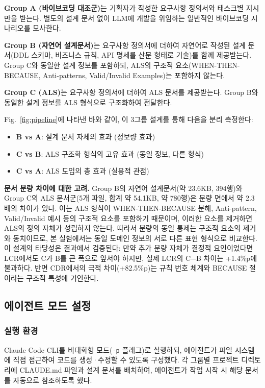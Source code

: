 \documentclass[conference]{IEEEtran}
\begin{document}
\textbf{Group A (바이브코딩 대조군)}는 기획자가 작성한 요구사항 정의서와 태스크별 지시만을 받는다. 별도의 설계 문서 없이 LLM에 개발을 위임하는 일반적인 바이브코딩 시나리오를 모사한다.

\textbf{Group B (자연어 설계문서)}는 요구사항 정의서에 더하여 자연어로 작성된 설계 문서(DDL 스키마, 비즈니스 규칙, API 명세를 산문 형태로 기술)를 함께 제공받는다. Group C와 동일한 설계 정보를 포함하되, ALS의 구조적 요소(WHEN-THEN-BECAUSE, Anti-patterns, Valid/Invalid Examples)는 포함하지 않는다.

\textbf{Group C (ALS)}는 요구사항 정의서에 더하여 ALS 문서를 제공받는다. Group B와 동일한 설계 정보를 ALS 형식으로 구조화하여 전달한다.

Fig.~\ref{fig:pipeline}에 나타낸 바와 같이, 이 3그룹 설계를 통해 다음을 분리 측정한다:
\begin{itemize}
  \item \textbf{B vs A}: 설계 문서 자체의 효과 (정보량 효과)
  \item \textbf{C vs B}: ALS 구조화 형식의 고유 효과 (동일 정보, 다른 형식)
  \item \textbf{C vs A}: ALS 도입의 총 효과 (실용적 관점)
\end{itemize}

\textbf{문서 분량 차이에 대한 고려.} Group B의 자연어 설계문서(약 23.6KB, 394행)와 Group C의 ALS 문서군(5개 파일, 합계 약 54.1KB, 약 780행)은 분량 면에서 약 2.3배의 차이가 있다. 이는 ALS 형식이 WHEN-THEN-BECAUSE 분해, Anti-pattern, Valid/Invalid 예시 등의 구조적 요소를 포함하기 때문이며, 이러한 요소를 제거하면 ALS의 정의 자체가 성립하지 않는다. 따라서 분량의 동일 통제는 구조적 요소의 제거와 동치이므로, 본 실험에서는 동일 도메인 정보의 서로 다른 표현 형식으로 비교한다. 이 설계의 타당성은 결과에서 검증된다: 만약 추가 분량 자체가 결정적 요인이었다면 LCR에서도 C가 B를 큰 폭으로 앞서야 하지만, 실제 LCR의 C$-$B 차이는 +1.4\%p에 불과하다. 반면 CDR에서의 극적 차이(+82.5\%p)는 규칙 번호 체계와 BECAUSE 절이라는 구조적 특성에 기인한다.

\subsection{에이전트 모드 설정}

\subsubsection{실행 환경}

Claude Code CLI를 비대화형 모드(\texttt{-p} 플래그)로 실행하되, 에이전트가 파일 시스템에 직접 접근하여 코드를 생성·수정할 수 있도록 구성했다. 각 그룹별 프로젝트 디렉토리에 CLAUDE.md 파일과 설계 문서를 배치하여, 에이전트가 작업 시작 시 해당 문서를 자동으로 참조하도록 했다.
\end{document}

